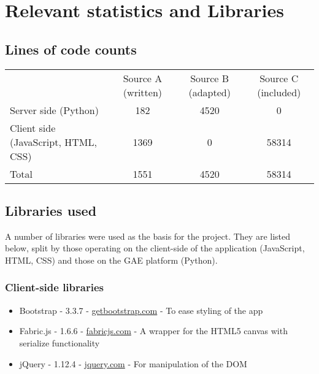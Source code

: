 \chapter{Relevant statistics and Libraries}\label{ch:statsAndLibs}\vspace{-10mm}

\section{Lines of code counts}

\vspace{-7mm}
\begin{center}
\begin{tabular}{ l c c c }
 & Source A (written) & Source B (adapted) & Source C (included) \\
 Server side (Python) & 182 & 4520 & 0 \\ 
 Client side (JavaScript, HTML, CSS) & 1369 & 0 & 58314 \\  
 Total & 1551 & 4520 & 58314
\end{tabular}
\end{center}

\section{Libraries used}
A number of libraries were used as the basis for the project. They are listed below, split by those operating on the client-side of the application (JavaScript, HTML, CSS) and those on the GAE platform (Python).

\subsection{Client-side libraries}
\begin{itemize}
   \item Bootstrap - 3.3.7 - \url{getbootstrap.com} - To ease styling of the app
   \item Fabric.js - 1.6.6 - \url{fabricjs.com} - A wrapper for the HTML5 canvas with serialize functionality
   \item jQuery - 1.12.4 - \url{jquery.com} - For manipulation of the DOM
\end{itemize}

